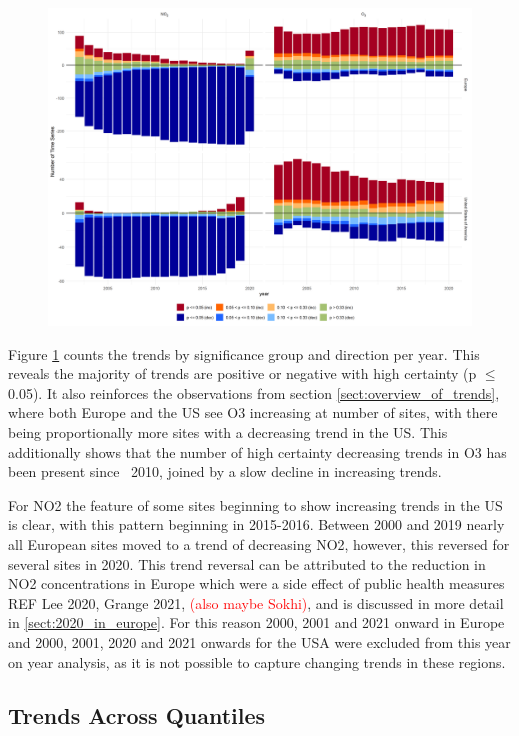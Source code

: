 \documentclass[journal abbreviation, manuscript]{copernicus}
\begin{document}
\begin{figure}[htbp]
\includegraphics[width=12cm]{plots/p_bar_year.png}
\caption{}
\label{fig:p_bar_year}
\end{figure}

Figure \ref{fig:p_bar_year} counts the trends by significance group and direction per year. This reveals the majority of trends are positive or negative with high certainty (p $\le$ 0.05). It also reinforces the observations from section \ref{sect:overview_of_trends}, where both Europe and the US see O3 increasing at number of sites, with there being proportionally more sites with a decreasing trend in the US. This additionally shows that the number of high certainty decreasing trends in O3 has been present since ~2010, joined by a slow decline in increasing trends. 

For NO2 the feature of some sites beginning to show increasing trends in the US is clear, with this pattern beginning in 2015-2016. Between 2000 and 2019 nearly all European sites moved to a trend of decreasing NO2, however, this reversed for several sites in 2020. This trend reversal can be attributed to the reduction in NO2 concentrations in Europe which were a side effect of public health measures REF Lee 2020, Grange 2021, \textcolor{red}{(also maybe Sokhi)}, and is discussed in more detail in \ref{sect:2020_in_europe}. For this reason 2000, 2001 and 2021 onward in Europe and 2000, 2001, 2020 and 2021 onwards for the USA were excluded from this year on year analysis, as it is not possible to capture changing trends in these regions. 


\subsection{Trends Across Quantiles}
\end{document}
